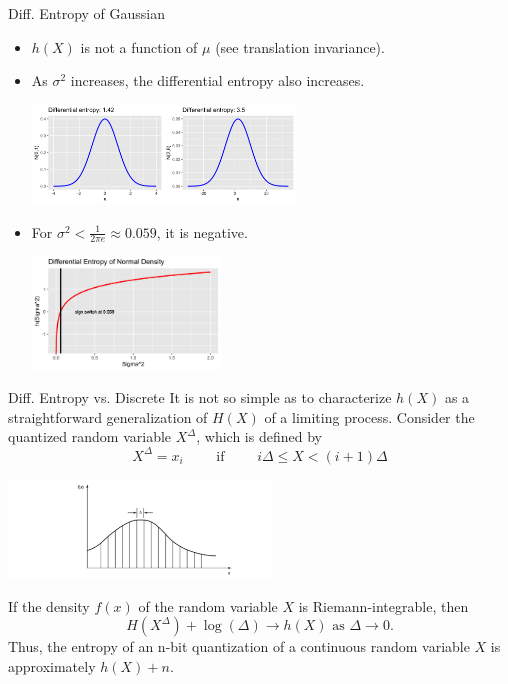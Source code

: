 \documentclass[11pt,compress,t,notes=noshow, xcolor=table]{beamer}
\begin{document}
\begin{vbframe}{Diff. Entropy of Gaussian}
  \begin{itemize}
    \item $h(X)$ is not a function of $\mu$ (see translation invariance).
    \item As $\sigma^2$ increases, the differential entropy also increases.
     \begin{center}
    \includegraphics[width = 7cm ]{figure/normal_entropy.png}
    \end{center}
    \item For $\sigma^2 < \frac{1}{2\pi e}\approx 0.059$, it is negative.
    \begin{center}
    \includegraphics[width = 5cm ]{figure/normal_entropy_sigma.png}
    \end{center}
    
  \end{itemize}
\end{vbframe}


\begin{vbframe}{Diff. Entropy vs. Discrete}
It is not so simple as to characterize $h(X)$ as 
a straightforward generalization of $H(X)$ of a limiting process.
Consider the quantized random variable $X^\Delta$, which is defined by
$$X^\Delta = x_i \qquad \text{ if } \qquad i \Delta \leq X < (i + 1) \Delta$$  
\begin{center}
\includegraphics[width = 7cm ]{figure_man/diffent-quant.png} \\
\end{center}

If the density $f(x)$ of the random variable $X$ is Riemann-integrable, then
$$H(X^\Delta) + \log(\Delta) \rightarrow h(X) \text{ as } \Delta \rightarrow 0.$$
Thus, the entropy of an n-bit quantization of a continuous random variable 
$X$ is approximately $h(X) + n$.
\end{vbframe}
\end{document}
